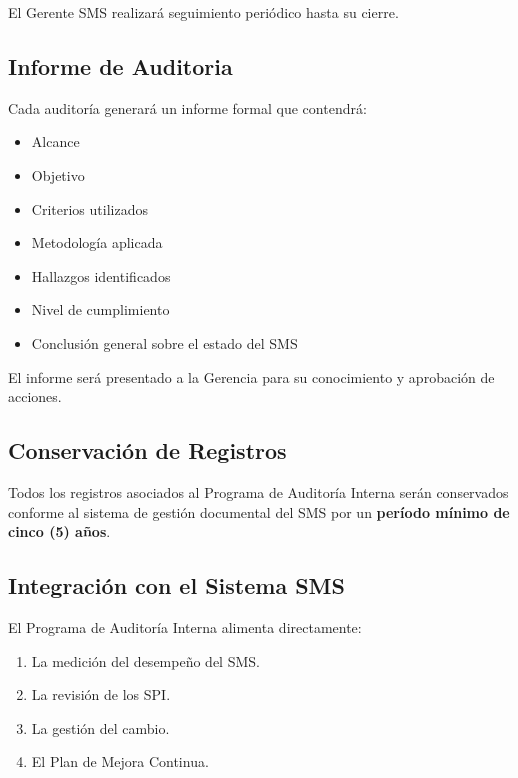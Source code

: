 El Gerente SMS realizará seguimiento periódico hasta su cierre.

\subsection{Informe de Auditoria}
Cada auditoría generará un informe formal que contendrá:

\begin{itemize}
    \item Alcance

    \item Objetivo

    \item Criterios utilizados

    \item Metodología aplicada

    \item Hallazgos identificados

    \item Nivel de cumplimiento

    \item Conclusión general sobre el estado del SMS
\end{itemize}

El informe será presentado a la Gerencia para su conocimiento y aprobación de acciones.

\subsection{Conservación de Registros}
Todos los registros asociados al Programa de Auditoría Interna serán conservados conforme al sistema de gestión documental del SMS por un \textbf{período mínimo de cinco (5) años}.

\subsection{Integración con el Sistema SMS}

El Programa de Auditoría Interna alimenta directamente:

\begin{enumerate}
    \item La medición del desempeño del SMS.

    \item La revisión de los SPI.

    \item La gestión del cambio.

    \item El Plan de Mejora Continua.

\end{enumerate}

